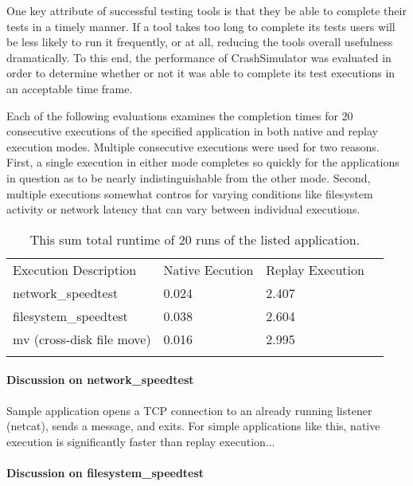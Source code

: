 One key attribute of successful testing tools is that they be able to complete their tests in a timely manner.
If a tool takes too long to complete its tests users will be less likely to run it frequently, or at all,
reducing the tools overall usefulness dramatically. To this end, the performance of CrashSimulator was evaluated
in order to determine whether or not it was able to complete its test executions in an acceptable time frame.

Each of the following evaluations examines the completion times for 20 consecutive executions of the specified
application in both native and replay execution modes.  Multiple consecutive executions were used for two
reasons.  First, a single execution in either mode completes so quickly for the applications in question as to
be nearly indistinguishable from the other mode.  Second, multiple executions somewhat contros for varying
conditions like filesystem activity or network latency that can vary between individual executions.

    \begin{table}[H]
        \scriptsize{}
        \begin{tabular}{l  l  l  l}
            \toprule{}
                Execution Description & Native Eecution & Replay Execution\\
                network\_speedtest & 0.024 & 2.407 \\
                filesystem\_speedtest & 0.038 & 2.604 \\
                mv (cross-disk file move) & 0.016 & 2.995 \\
            \bottomrule{}
        \end{tabular}
        \caption{This sum total runtime of 20 runs of the listed application.}
    \end{table}

\paragraph{Discussion on network\_speedtest}

Sample application opens a TCP connection to an already running listener (netcat), sends a message, and
exits. For simple applications like this, native execution is significantly faster than replay execution...

\paragraph{Discussion on filesystem\_speedtest}

